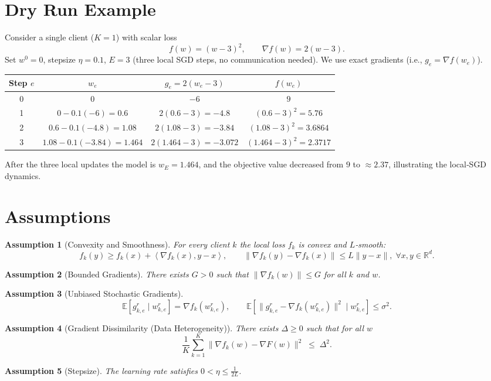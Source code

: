 \documentclass{article}
\newtheorem{assumption}{Assumption}
\newcommand{\E}{\mathbb{E}}
\newcommand{\ip}[2]{\left\langle #1,#2\right\rangle}
\begin{document}
\section*{Dry Run Example}
Consider a single client ($K=1$) with scalar loss
\[
    f(w)=(w-3)^{2},\qquad \nabla f(w)=2(w-3).
\]
Set $w^{0}=0$, stepsize $\eta=0.1$, $E=3$ (three local SGD steps, no communication needed).  
We use exact gradients (i.e., $g_{e}= \nabla f(w_{e})$).

\begin{center}
\begin{tabular}{c|c|c|c}
Step $e$ & $w_{e}$ & $g_{e}=2(w_{e}-3)$ & $f(w_{e})$\\\hline
0 & $0$ & $-6$ & $9$\\
1 & $0-0.1(-6)=0.6$ & $2(0.6-3)=-4.8$ & $(0.6-3)^{2}=5.76$\\
2 & $0.6-0.1(-4.8)=1.08$ & $2(1.08-3)=-3.84$ & $(1.08-3)^{2}=3.6864$\\
3 & $1.08-0.1(-3.84)=1.464$ & $2(1.464-3)=-3.072$ & $(1.464-3)^{2}=2.3717$
\end{tabular}
\end{center}
After the three local updates the model is $w_{E}=1.464$, and the objective value decreased from $9$ to $\approx2.37$, illustrating the local‑SGD dynamics.

\newpage

\section*{Assumptions}
\begin{assumption}[Convexity and Smoothness]\label{ass:convex}
For every client $k$ the local loss $f_k$ is convex and $L$‑smooth:
\[
    f_k(y)\ge f_k(x)+\ip{\nabla f_k(x)}{y-x},\qquad
    \|\nabla f_k(y)-\nabla f_k(x)\|\le L\|y-x\|,
    \;\forall x,y\in\mathbb{R}^{d}.
\]
\end{assumption}
\begin{assumption}[Bounded Gradients]\label{ass:grad}
There exists $G>0$ such that $\|\nabla f_k(w)\|\le G$ for all $k$ and $w$.
\end{assumption}
\begin{assumption}[Unbiased Stochastic Gradients]\label{ass:unbiased}
\[
    \E[g_{k,e}^{r}\mid w_{k,e}^{r}]=\nabla f_k\!\left(w_{k,e}^{r}\right),\qquad
    \E\!\left[\|g_{k,e}^{r}-\nabla f_k(w_{k,e}^{r})\|^{2}\mid w_{k,e}^{r}\right]\le\sigma^{2}.
\]
\end{assumption}
\begin{assumption}[Gradient Dissimilarity (Data Heterogeneity)]\label{ass:hetero}
There exists $\Delta\ge0$ such that for all $w$
\[
    \frac1K\sum_{k=1}^{K}\|\nabla f_k(w)-\nabla F(w)\|^{2}\;\le\;\Delta^{2}.
\]
\end{assumption}
\begin{assumption}[Stepsize]\label{ass:stepsize}
The learning rate satisfies $0<\eta\le \frac{1}{2L}$.
\end{assumption}
\end{document}
